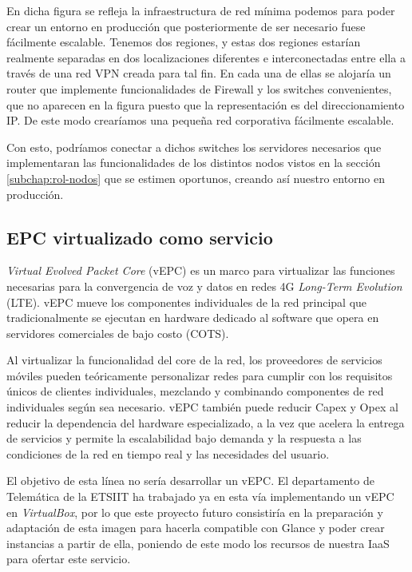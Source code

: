 En dicha figura se refleja la infraestructura de red mínima podemos para poder crear un entorno en producción que posteriormente de ser necesario fuese fácilmente escalable. Tenemos dos regiones, y estas dos regiones estarían realmente separadas en dos localizaciones diferentes e interconectadas entre ella a través de una red VPN creada para tal fin. En cada una de ellas se alojaría un router que implemente funcionalidades de Firewall y los switches convenientes, que no aparecen en la figura puesto que la representación es del direccionamiento IP. De este modo crearíamos una pequeña red corporativa fácilmente escalable.

Con esto, podríamos conectar a dichos switches los servidores necesarios que implementaran las funcionalidades de los distintos nodos vistos en la sección \ref{subchap:rol-nodos} que se estimen oportunos, creando así nuestro entorno en producción.

\subsection{EPC virtualizado como servicio}
\textit{Virtual Evolved Packet Core} (vEPC) es un marco para virtualizar las funciones necesarias para la convergencia de voz y datos en redes 4G \textit{Long-Term Evolution} (LTE). vEPC mueve los componentes individuales de la red principal que tradicionalmente se ejecutan en hardware dedicado al software que opera en servidores comerciales de bajo costo (COTS).

Al virtualizar la funcionalidad del core de la red, los proveedores de servicios móviles pueden teóricamente personalizar redes para cumplir con los requisitos únicos de clientes individuales, mezclando y combinando componentes de red individuales según sea necesario. vEPC también puede reducir Capex y Opex al reducir la dependencia del hardware especializado, a la vez que acelera la entrega de servicios y permite la escalabilidad bajo demanda y la respuesta a las condiciones de la red en tiempo real y las necesidades del usuario.

El objetivo de esta línea no sería desarrollar un vEPC. El departamento de Telemática de la ETSIIT ha trabajado ya en esta vía implementando un vEPC en \textit{VirtualBox}, por lo que este proyecto futuro consistiría en la preparación y adaptación de esta imagen para hacerla compatible con Glance y poder crear instancias a partir de ella, poniendo de este modo los recursos de nuestra IaaS para ofertar este servicio.

